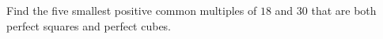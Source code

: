 Find the five smallest positive common multiples of $18$ and $30$ that are both perfect squares and perfect cubes.

